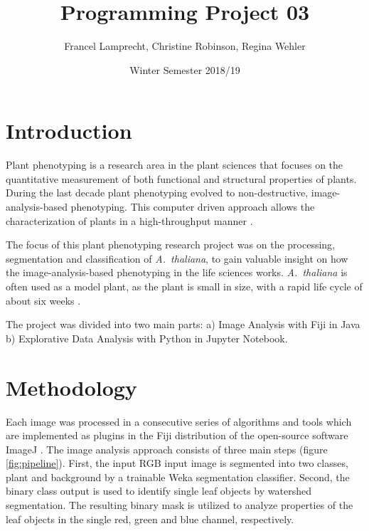 \documentclass[paper=A4,bibliography=totocnumbered]{scrartcl}
\title{Programming Project 03}
\author{Francel Lamprecht, Christine Robinson, Regina Wehler}
\date{Winter Semester 2018/19}
\begin{document}
\maketitle

\tableofcontents
\clearpage
\section{Introduction}
Plant phenotyping is a research  area in the plant sciences that focuses on the quantitative measurement of both functional and structural properties of plants. During the last decade plant phenotyping evolved to non-destructive, image-analysis-based phenotyping. This computer driven approach allows the characterization of plants in a high-throughput manner \citep{Walter.2015}.

The focus of this plant phenotyping research project was on the processing, segmentation and classification of \textit{A.~thaliana}, to gain valuable insight on how the image-analysis-based phenotyping in the life sciences works. \textit{A.~thaliana} is often used as a model plant, as the plant is small in size, with a rapid life cycle of about six weeks \citep{Koornneef.2010}. 

The project was divided into two main parts:
a) Image Analysis with Fiji in Java
b) Explorative Data Analysis with Python in Jupyter Notebook.

\section{Methodology}
Each image was processed in a consecutive series of algorithms and tools which are implemented as plugins in the Fiji distribution \citep{Schindelin.2012} of the open-source software ImageJ \citep{Rueden.2017}. The image analysis approach consists of three main steps (figure \ref{fig:pipeline}). First, the input RGB input image is segmented into two classes, plant and background by a trainable Weka segmentation classifier. Second, the binary class output is used to identify single leaf objects by watershed segmentation. The resulting binary mask is utilized to analyze properties of the leaf objects in the single red, green and blue channel, respectively.
\end{document}
